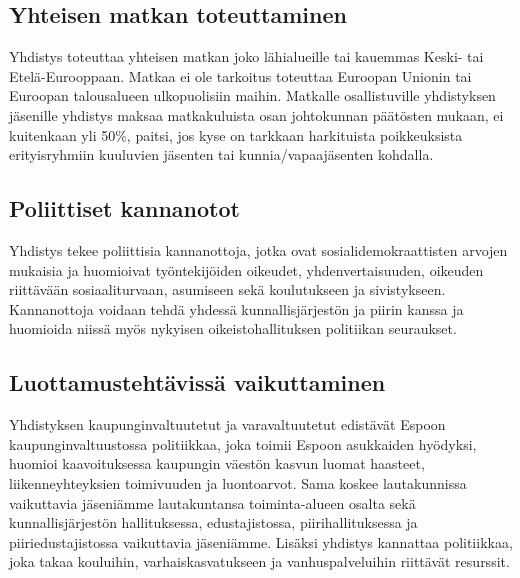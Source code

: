 \documentclass[a4paper,12pt]{article}
\begin{document}
\subsection{Yhteisen matkan toteuttaminen}
Yhdistys toteuttaa yhteisen matkan joko lähialueille tai kauemmas Keski- tai Etelä-Eurooppaan. Matkaa ei ole tarkoitus toteuttaa Euroopan Unionin tai Euroopan talousalueen ulkopuolisiin maihin. Matkalle osallistuville yhdistyksen jäsenille yhdistys maksaa matkakuluista osan johtokunnan päätösten mukaan, ei kuitenkaan yli 50\%, paitsi, jos kyse on tarkkaan harkituista poikkeuksista erityisryhmiin kuuluvien jäsenten tai kunnia/vapaajäsenten kohdalla.
\subsection{Poliittiset kannanotot}
Yhdistys tekee poliittisia kannanottoja, jotka ovat sosialidemokraattisten arvojen mukaisia ja huomioivat työntekijöiden oikeudet, yhdenvertaisuuden, oikeuden riittävään sosiaaliturvaan, asumiseen sekä koulutukseen ja sivistykseen. Kannanottoja voidaan tehdä yhdessä kunnallisjärjestön ja piirin kanssa ja huomioida niissä myös nykyisen oikeistohallituksen politiikan seuraukset.
\subsection{Luottamustehtävissä vaikuttaminen}
Yhdistyksen kaupunginvaltuutetut ja varavaltuutetut edistävät Espoon kaupunginvaltuustossa politiikkaa, joka toimii Espoon asukkaiden hyödyksi, huomioi kaavoituksessa kaupungin väestön kasvun luomat haasteet, liikenneyhteyksien toimivuuden ja luontoarvot. Sama koskee lautakunnissa vaikuttavia jäseniämme lautakuntansa toiminta-alueen osalta sekä kunnallisjärjestön hallituksessa, edustajistossa, piirihallituksessa ja piiriedustajistossa vaikuttavia jäseniämme. Lisäksi yhdistys kannattaa politiikkaa, joka takaa kouluihin, varhaiskasvatukseen ja vanhuspalveluihin riittävät resurssit.
\end{document}
